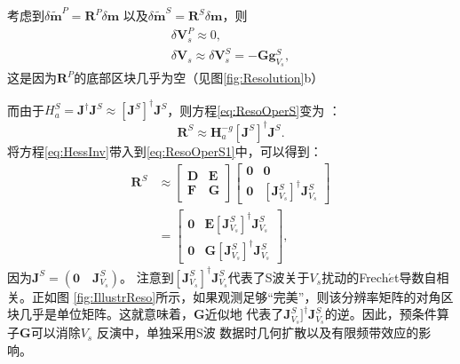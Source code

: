 考虑到$\delta \mathbf{\tilde{m}}^P=\mathbf{R}^P\delta \mathbf{m}$ 以及$\delta \mathbf{\tilde{m}}^S=\mathbf{R}^S\delta \mathbf{m}$，则
\begin{equation}
\begin{split}
        \delta \mathbf{V}^P_s\approx0, \\
        \delta \mathbf{V}_s \approx \delta
        \mathbf{V}^S_s=-\mathbf{G}\mathbf{g}^S_{V_s},
        \label{eq:gradGN}
\end{split}
\end{equation}
这是因为$\mathbf{R}^P$的底部区块几乎为空（见图\ref{fig:Resolution}b）

而由于$H^S_a=\mathbf{J}^{\dagger}\mathbf{J}^S\approx[\mathbf{J}^S]^{\dagger}\mathbf{J}^S$，则方程\eqref{eq:ResoOperS}变为
：
\begin{equation}
        \mathbf{R}^S\approx\mathbf{H}^{-g}_a[\mathbf{J}^S]^{\dagger}\mathbf{J}^S.
        \label{eq:ResoOperS1}
\end{equation}
将方程\eqref{eq:HessInv}带入到\eqref{eq:ResoOperS1}中，可以得到：
\begin{equation}
        \begin{split}
        \mathbf{R}^S
        &\approx
    \begin{bmatrix}
                \mathbf{D}&\mathbf{E} \\
                \mathbf{F}&\mathbf{G}
        \end{bmatrix}
    \begin{bmatrix}
        \mathbf{0}&\mathbf{0}\\
        \mathbf{0}&[\mathbf{J}^S_{V_s}]^{\dagger}\mathbf{J}_{V_s}^S
        \end{bmatrix}\\
        &=
    \begin{bmatrix}
                \mathbf{0}&\mathbf{E}[\mathbf{J}^S_{V_s}]^{\dagger}\mathbf{J}^S_{V_s}\\
                \mathbf{0}&\mathbf{G}[\mathbf{J}^S_{V_s}]^{\dagger}\mathbf{J}^S_{V_s}
        \end{bmatrix},
        \end{split}
        \label{eq:ResoOperS2}
\end{equation}
因为$\mathbf{J}^S=(\mathbf{0}\quad\mathbf{J}^S_{V_s})$。
注意到$[\mathbf{J}^S_{V_s}]^{\dagger}\mathbf{J}^S_{V_s}$代表了S波关于$V_s$扰动的Frech{$\acute{e}$}t导数自相关。正如图
\ref{fig:IllustrReso}所示，如果观测足够“完美”，则该分辨率矩阵的对角区块几乎是单位矩阵。这就意味着，$\mathbf{G}$近似地
代表了$\mathbf{J}^S_{V_s}]^{\dagger}\mathbf{J}^S_{V_s}$的逆。因此，预条件算子$\mathbf{G}$可以消除$V_s$ 反演中，单独采用S波
数据时几何扩散以及有限频带效应的影响。
